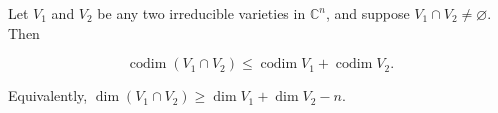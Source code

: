 Let $V_1$ and $V_2$ be any two irreducible varieties in $\mathbb{C}^n$, and suppose $V_1 \cap V_2 \neq \varnothing$. Then

$$\operatorname{codim}(V_1 \cap V_2) \leqslant \operatorname{codim} V_1 + \operatorname{codim} V_2.$$

Equivalently, $\dim(V_1 \cap V_2) \geqslant \dim V_1 + \dim V_2 - n$.
